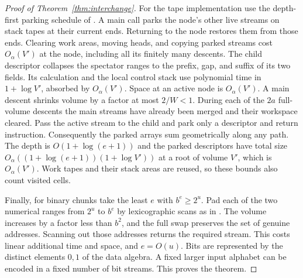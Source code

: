 \begin{proof}[Proof of Theorem~\ref{thm:interchange}]
For the tape implementation use the depth-first parking schedule of
\cite[Proposition~11]{Tape}. A main call
parks the node's other live streams on stack tapes at their current
ends. Returning to the node restores them from those ends. Clearing
work areas, moving heads, and copying parked streams cost $O_\alpha(V')$
at the node, including all its finitely many descents. The child
descriptor collapses the spectator ranges to the prefix, gap, and
suffix of its two fields. Its calculation and the local control stack
use polynomial time in $1+\log V'$, absorbed by $O_\alpha(V')$.
Space at an active node is $O_\alpha(V')$. A main descent shrinks
volume by a factor at most $2/W<1$. During each of the $2a$
full-volume descents the main streams have already been merged and
their workspace cleared. Pass the active stream to the child and
park only a descriptor and return instruction. Consequently the
parked arrays sum geometrically along any path. The depth is
$O(1+\log(e+1))$ and the parked descriptors have total size
$O_\alpha((1+\log(e+1))(1+\log V'))$ at a root of volume $V'$,
which is $O_\alpha(V')$. Work tapes and their stack areas are reused,
so these bounds also count visited cells.

Finally, for binary chunks take the least $e$ with $b^e\ge 2^u$.
Pad each of the two numerical ranges from $2^u$ to $b^e$ by lexicographic
scans as in \cite[Lemma~12]{Tape}. The volume
increases by a factor less than $b^2$, and the full swap preserves
the set of genuine addresses. Scanning out those addresses returns
the required stream. This costs linear additional time and space,
and $e=O(u)$. Bits are represented by the distinct elements $0,1$ of
the data algebra. A fixed larger input alphabet can be encoded in a
fixed number of bit streams. This proves the theorem.
\end{proof}
